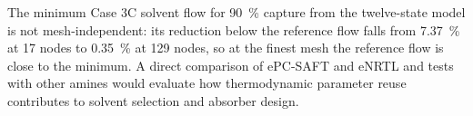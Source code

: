 The minimum Case 3C solvent flow for \qty{90}{\percent} capture from the twelve-state model is not mesh-independent: its reduction below the reference flow falls from \qty{7.37}{\percent} at 17 nodes to \qty{0.35}{\percent} at 129 nodes, so at the finest mesh the reference flow is close to the minimum.
A direct comparison of ePC-SAFT and eNRTL and tests with other amines would evaluate how thermodynamic parameter reuse contributes to solvent selection and absorber design.

\clearpage
\nolinenumbers
\raggedbottom
